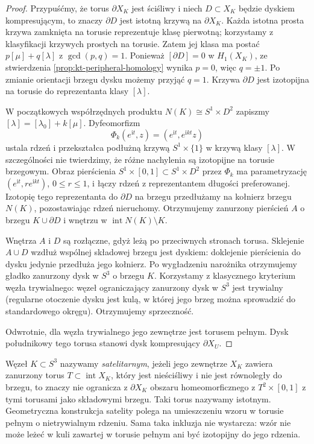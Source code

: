 \begin{proof}
Przypuśćmy, że torus $\partial X_K$ jest ściśliwy i niech
$D\subset X_K$ będzie dyskiem kompresującym, to znaczy
$\partial D$ jest istotną krzywą na $\partial X_K$.
Każda istotna prosta krzywa zamknięta na torusie
reprezentuje klasę pierwotną; korzystamy z klasyfikacji
krzywych prostych na torusie. Zatem jej klasa ma
postać $p[\mu]+q[\lambda]$ z $\gcd(p,q)=1$.
Ponieważ $[\partial D]=0$ w $H_1(X_K)$,
ze stwierdzenia \ref{prop:kt-peripheral-homology}
wynika $p=0$, więc $q=\pm1$.
Po zmianie orientacji brzegu dysku możemy przyjąć
$q=1$. Krzywa $\partial D$ jest izotopijna na
torusie do reprezentanta klasy $[\lambda]$.

W początkowych współrzędnych produktu
$N(K)\cong S^1\times D^2$ zapiszmy
$[\lambda]=[\lambda_0]+k[\mu]$.
Dyfeomorfizm
\[
\Phi_k(e^{\mathrm it},z)=(e^{\mathrm it},e^{\mathrm ikt}z)
\]
ustala rdzeń i przekształca podłużną krzywą
$S^1\times\{1\}$ w krzywą klasy $[\lambda]$.
W szczególności nie twierdzimy, że różne nachylenia
są izotopijne na torusie brzegowym. Obraz pierścienia
$S^1\times[0,1]\subset S^1\times D^2$ przez
$\Phi_k$ ma parametryzację
$(e^{\mathrm it},r e^{\mathrm ikt})$, $0\leq r\leq1$,
i łączy rdzeń z reprezentantem długości preferowanej.
Izotopię tego reprezentanta do $\partial D$ na
brzegu przedłużamy na kołnierz brzegu $N(K)$,
pozostawiając rdzeń nieruchomy. Otrzymujemy
zanurzony pierścień $A$ o brzegu $K\cup\partial D$
i wnętrzu w $\operatorname{int}N(K)\setminus K$.

Wnętrza $A$ i $D$ są rozłączne, gdyż leżą po
przeciwnych stronach torusa. Sklejenie $A\cup D$
wzdłuż wspólnej składowej brzegu jest dyskiem:
doklejenie pierścienia do dysku jedynie przedłuża
jego kołnierz. Po wygładzeniu narożnika otrzymujemy
gładko zanurzony dysk w $S^3$ o brzegu $K$.
Korzystamy z klasycznego kryterium węzła trywialnego:
węzeł ograniczający zanurzony dysk w $S^3$ jest
trywialny (regularne otoczenie dysku jest kulą,
w której jego brzeg można sprowadzić do standardowego
okręgu). Otrzymujemy sprzeczność.

Odwrotnie, dla węzła trywialnego jego zewnętrze jest
torusem pełnym. Dysk południkowy tego torusa stanowi
dysk kompresujący $\partial X_U$.
\end{proof}

\begin{definicja}
Węzeł $K\subset S^3$ nazywamy \emph{satelitarnym}, jeżeli jego
zewnętrze $X_K$ zawiera zanurzony torus
$T\subset\operatorname{int}X_K$, który jest nieściśliwy
i nie jest równoległy do brzegu, to znaczy nie ogranicza
z $\partial X_K$ obszaru homeomorficznego z
$T^2\times[0,1]$ z tymi torusami jako składowymi brzegu.
Taki torus nazywamy istotnym. Geometryczna konstrukcja
satelity polega na umieszczeniu wzoru w torusie pełnym
o nietrywialnym rdzeniu. Sama taka inkluzja nie wystarcza:
wzór nie może leżeć w kuli zawartej w torusie pełnym
ani być izotopijny do jego rdzenia.
\end{definicja}

